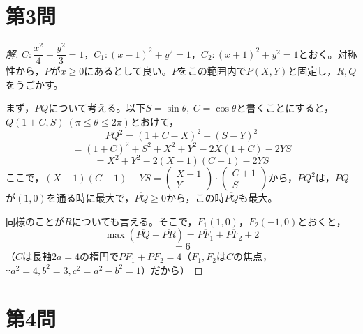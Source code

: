 \documentclass[../main.tex]{subfiles}
\begin{document}
\newpage

\section*{第3問}

\begin{proof}[解]
  $C: \dfrac{x^2}{4}+\dfrac{y^2}{3}=1$，$C_1: (x-1)^2+y^2=1$，$C_2: (x+1)^2+y^2=1$とおく。対称性から，$P$が$x\ge0$にあるとして良い。$P$をこの範囲内で$P(X,Y)$と固定し，$R,Q$をうごかす。

  まず，$PQ$について考える。以下$S=\sin\theta,\ C=\cos\theta$と書くことにすると，$Q(1+C,S)\ (\pi\le\theta\le2\pi)$とおけて，
  \[
    PQ^2=(1+C-X)^2+(S-Y)^2
  \]
  \[
    =(1+C)^2+S^2+X^2+Y^2-2X(1+C)-2YS
  \]
  \[
    =X^2+Y^2-2(X-1)(C+1)-2YS
  \]
  ここで，$(X-1)(C+1)+YS=
  \begin{pmatrix}X-1\\Y
  \end{pmatrix}\cdot
  \begin{pmatrix}C+1\\S
  \end{pmatrix}$から，$PQ^2$は，$PQ$が$(1,0)$を通る時に最大で，$\overline{PQ}\ge0$から，この時$\overline{PQ}$も最大。

  同様のことが$R$についても言える。そこで，$F_1(1,0)$，$F_2(-1,0)$とおくと，
  \[
    \max(\overline{PQ}+\overline{PR})=\overline{PF_1}+\overline{PF_2}+2
  \]
  \[
    =6
  \]
  （$C$は長軸$2a=4$の楕円で$\overline{PF_1}+\overline{PF_2}=4$（$F_1,F_2$は$C$の焦点，$\because a^2=4,b^2=3,c^2=a^2-b^2=1$）だから）
\end{proof}

\newpage

\section*{第4問}
\end{document}
